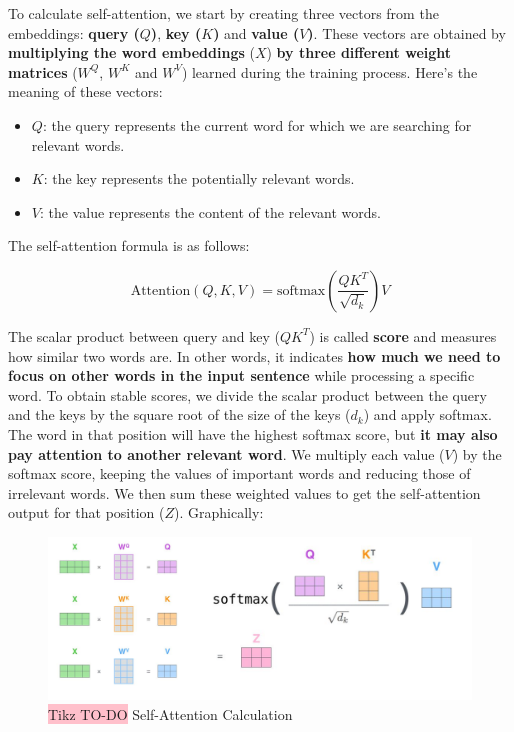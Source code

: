 To calculate self-attention, we start by creating three vectors from the embeddings: \textbf{query ($Q$)}, \textbf{key ($K$)} and \textbf{value ($V$)}. These vectors are obtained by \textbf{multiplying the word embeddings} ($X$) \textbf{by three different weight matrices} ($W^Q$, $W^K$ and $W^V$) learned during the training process. Here's the meaning of these vectors:
\begin{itemize}
    \item $Q$: the query represents the current word for which we are searching for relevant words.
    \item $K$: the key represents the potentially relevant words.
    \item $V$: the value represents the content of the relevant words.
\end{itemize}

The self-attention formula is as follows:

$$
    \text{Attention}(Q,K,V) = \text{softmax}\left(\frac{QK^T}{\sqrt{d_k}}\right)V
$$

The scalar product between query and key ($QK^T$) is called \textbf{score} and measures how similar two words are. In other words, it indicates \textbf{how much we need to focus on other words in the input sentence} while processing a specific word. To obtain stable scores, we divide the scalar product between the query and the keys by the square root of the size of the keys (\(d_k\)) and apply softmax. The word in that position will have the highest softmax score, but \textbf{it may also pay attention to another relevant word}. We multiply each value ($V$) by the softmax score, keeping the values of important words and reducing those of irrelevant words. We then sum these weighted values to get the self-attention output for that position ($Z$). Graphically:

\begin{figure}[!htbp]
    \centering
    \includegraphics[width=0.8\linewidth]{tikz/chapter8 - Self-Attention Calculation.png}
    \caption{{\color{red}\colorbox{pink}{Tikz TO-DO}} Self-Attention Calculation}
\end{figure}


